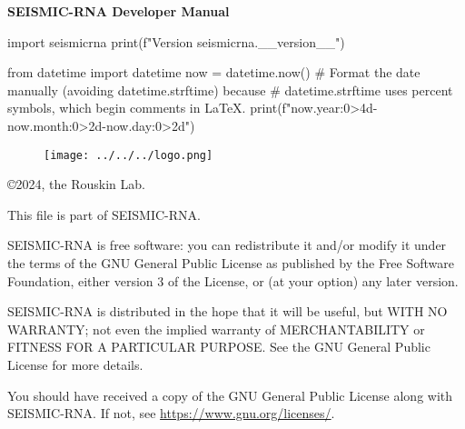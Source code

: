 \documentclass[main.tex]{subfiles}
\begin{document}
\begin{titlepage}


\begin{center}

\huge
\textbf{SEISMIC-RNA Developer Manual}
\normalsize

\vspace{0.5cm}

\Large
\begin{python}
import seismicrna
print(f"Version {seismicrna.__version__}")
\end{python}
\normalsize

\vspace{0.25cm}

\Large
\begin{python}
from datetime import datetime
now = datetime.now()
# Format the date manually (avoiding datetime.strftime) because
# datetime.strftime uses percent symbols, which begin comments in LaTeX.
print(f"{now.year:0>4d}-{now.month:0>2d}-{now.day:0>2d}")
\end{python}
\normalsize

\end{center}

\vspace{2cm}

\begin{figure}[h]
    \texttt{[image: ../../../logo.png]}
\end{figure}


\end{titlepage}


\pagebreak



\noindent
\copyright 2024, the Rouskin Lab.

\vspace{0.5cm}

\noindent
This file is part of SEISMIC-RNA.

\vspace{0.25cm}

\noindent
SEISMIC-RNA is free software: you can redistribute it and/or modify it
under the terms of the GNU General Public License as published by the
Free Software Foundation, either version 3 of the License, or (at your
option) any later version.

\vspace{0.25cm}

\noindent
SEISMIC-RNA is distributed in the hope that it will be useful, but WITH
NO WARRANTY; not even the implied warranty of MERCHANTABILITY or FITNESS
FOR A PARTICULAR PURPOSE. See the GNU General Public License for more
details.

\vspace{0.25cm}

\noindent
You should have received a copy of the GNU General Public License along
with SEISMIC-RNA. If not, see \url{https://www.gnu.org/licenses/}.


\pagebreak
\end{document}
